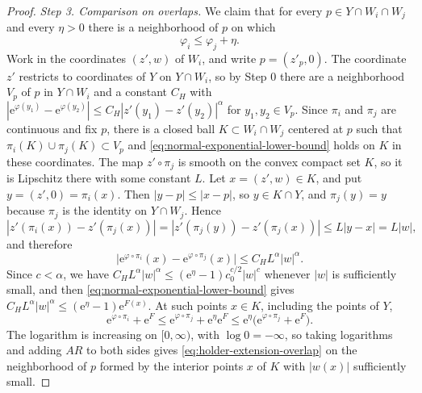 \begin{proof}
\emph{Step 3. Comparison on overlaps.} We claim that for every $p\in Y\cap W_i\cap W_j$ and every $\eta>0$ there is a neighborhood of $p$ on which
\begin{equation}\label{eq:holder-extension-overlap}
 \varphi_i\leq\varphi_j+\eta.
\end{equation}
Work in the coordinates $(z',w)$ of $W_i$, and write $p=(z'_p,0)$. The coordinate $z'$ restricts to coordinates of $Y$ on $Y\cap W_i$, so by Step 0 there are a neighborhood $V_p$ of $p$ in $Y\cap W_i$ and a constant $C_H$ with $|\mathrm e^{\varphi(y_1)}-\mathrm e^{\varphi(y_2)}|\leq C_H|z'(y_1)-z'(y_2)|^\alpha$ for $y_1,y_2\in V_p$. Since $\pi_i$ and $\pi_j$ are continuous and fix $p$, there is a closed ball $K\subset W_i\cap W_j$ centered at $p$ such that $\pi_i(K)\cup\pi_j(K)\subset V_p$ and \eqref{eq:normal-exponential-lower-bound} holds on $K$ in these coordinates. The map $z'\circ\pi_j$ is smooth on the convex compact set $K$, so it is Lipschitz there with some constant $L$. Let $x=(z',w)\in K$, and put $y=(z',0)=\pi_i(x)$. Then $|y-p|\leq|x-p|$, so $y\in K\cap Y$, and $\pi_j(y)=y$ because $\pi_j$ is the identity on $Y\cap W_j$. Hence
\[
 |z'(\pi_i(x))-z'(\pi_j(x))|=|z'(\pi_j(y))-z'(\pi_j(x))|\leq L|y-x|=L|w|,
\]
and therefore
\[
 \bigl|\mathrm e^{\varphi\circ\pi_i}(x)-\mathrm e^{\varphi\circ\pi_j}(x)\bigr|\leq C_HL^\alpha|w|^\alpha.
\]
Since $c<\alpha$, we have $C_HL^\alpha|w|^\alpha\leq(\mathrm e^\eta-1)c_0^{c/2}|w|^c$ whenever $|w|$ is sufficiently small, and then \eqref{eq:normal-exponential-lower-bound} gives $C_HL^\alpha|w|^\alpha\leq(\mathrm e^\eta-1)\mathrm e^{F(x)}$. At such points $x\in K$, including the points of $Y$,
\[
 \mathrm e^{\varphi\circ\pi_i}+\mathrm e^F
 \leq\mathrm e^{\varphi\circ\pi_j}+\mathrm e^\eta\mathrm e^F
 \leq\mathrm e^\eta\bigl(\mathrm e^{\varphi\circ\pi_j}+\mathrm e^F\bigr).
\]
The logarithm is increasing on $[0,\infty)$, with $\log0=-\infty$, so taking logarithms and adding $AR$ to both sides gives \eqref{eq:holder-extension-overlap} on the neighborhood of $p$ formed by the interior points $x$ of $K$ with $|w(x)|$ sufficiently small.


\end{proof}
